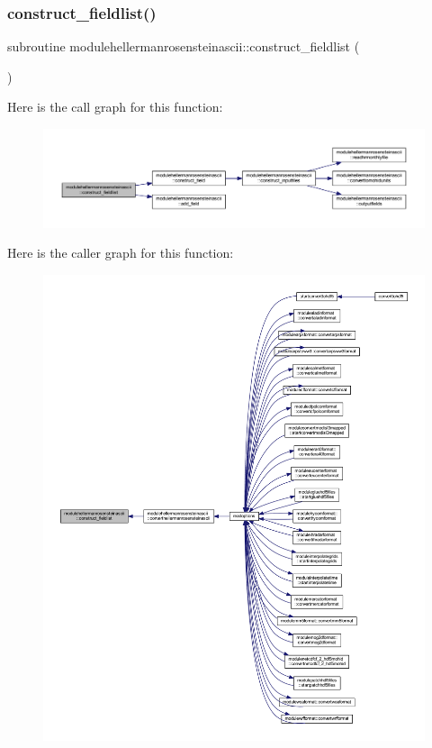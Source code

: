 \subsubsection{\texorpdfstring{construct\+\_\+fieldlist()}{construct\_fieldlist()}}
{\footnotesize\ttfamily subroutine modulehellermanrosensteinascii\+::construct\+\_\+fieldlist (\begin{DoxyParamCaption}{ }\end{DoxyParamCaption})\hspace{0.3cm}{\ttfamily [private]}}

Here is the call graph for this function\+:\nopagebreak
\begin{figure}[H]
\begin{center}
\leavevmode
\includegraphics[width=350pt]{namespacemodulehellermanrosensteinascii_aabd09e7a0437013b82c90ca944358684_cgraph}
\end{center}
\end{figure}
Here is the caller graph for this function\+:\nopagebreak
\begin{figure}[H]
\begin{center}
\leavevmode
\includegraphics[width=350pt]{namespacemodulehellermanrosensteinascii_aabd09e7a0437013b82c90ca944358684_icgraph}
\end{center}
\end{figure}
